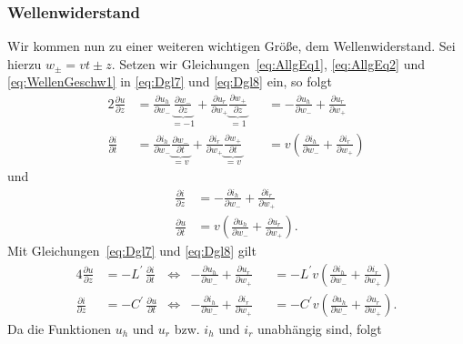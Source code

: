 \documentclass[paper=a4, parskip=half-, ngerman, fontsize=11pt]{scrreprt}
\begin{document}
\subsubsection{Wellenwiderstand}

Wir kommen nun zu einer weiteren wichtigen Größe, dem Wellenwiderstand. Sei hierzu \mbox{$w_{\pm} = v t \pm z$}.
Setzen wir Gleichungen~\eqref{eq:AllgEq1}, \eqref{eq:AllgEq2} und \eqref{eq:WellenGeschw1} in \eqref{eq:Dgl7} und
\eqref{eq:Dgl8} ein, so folgt
\begin{alignat*}{2}
    \frac{\partial u}{\partial z}
    &=
    \frac{\partial u_{h}}{\partial w_{-}}
    \underbrace{\frac{\partial w_{-}}{\partial z} }_{=-1}
    +
    \frac{\partial u_{r}}{\partial w_{+}}
    \underbrace{\frac{\partial w_{+}}{\partial z} }_{=1}
    &&=
    - \frac{\partial u_{h}}{\partial w_{-}} + \frac{\partial u_{r}}{\partial w_{+}} \\[1ex]
    \frac{\partial i}{\partial t}
    &=
    \frac{\partial i_{h}}{\partial w_{-}}
    \underbrace{\frac{\partial w_{-}}{\partial t} }_{=v}
    +
    \frac{\partial i_{r}}{\partial w_{+}}
    \underbrace{\frac{\partial w_{+}}{\partial t} }_{=v}
    &&=
    v \left( \frac{\partial i_{h}}{\partial w_{-}} + \frac{\partial i_{r}}{\partial w_{+}} \right)
\end{alignat*}
und
\begin{align*}
    \frac{\partial i}{\partial z} &=
    - \frac{\partial i_{h}}{\partial w_{-}} + \frac{\partial i_{r}}{\partial w_{+}} \\[1ex]
    \frac{\partial u}{\partial t} &=
    v \left( \frac{\partial u_{h}}{\partial w_{-}} + \frac{\partial u_{r}}{\partial w_{+}} \right).
\end{align*}
Mit Gleichungen~\eqref{eq:Dgl7} und \eqref{eq:Dgl8} gilt
\begin{alignat*}{4}
    \frac{\partial u}{\partial z} &= - L^{\prime} \, \frac{\partial i}{\partial t} & \Leftrightarrow &
    - \frac{\partial u_{h}}{\partial w_{-}} + \frac{\partial u_{r}}{\partial w_{+}}
    &&=
    - L^{\prime} v \left( \frac{\partial i_{h}}{\partial w_{-}} + \frac{\partial i_{r}}{\partial w_{+}} \right) \\[1ex]
    \frac{\partial i}{\partial z} &= - C^{\prime} \, \frac{\partial u}{\partial t} & \Leftrightarrow &
    - \frac{\partial i_{h}}{\partial w_{-}} + \frac{\partial i_{r}}{\partial w_{+}}
    &&=
    - C^{\prime} v \left( \frac{\partial u_{h}}{\partial w_{-}} + \frac{\partial u_{r}}{\partial w_{+}} \right).
\end{alignat*}
Da die Funktionen $u_{h}$ und $u_{r}$ bzw. $i_{h}$ und $i_{r}$ unabhängig sind, folgt
\end{document}

